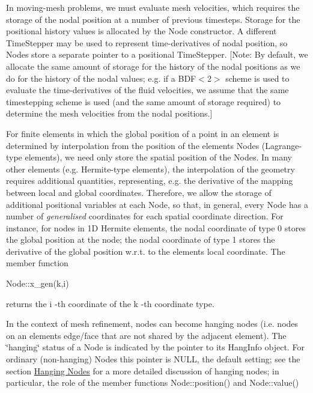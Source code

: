 \begin{DoxyItemize}
\item In moving-\/mesh problems, we must evaluate mesh velocities, which requires the storage of the nodal position at a number of previous timesteps. Storage for the positional history values is allocated by the {\ttfamily Node} constructor. A different {\ttfamily Time\+Stepper} may be used to represent time-\/derivatives of nodal position, so {\ttfamily Nodes} store a separate pointer to a positional {\ttfamily Time\+Stepper}. \mbox{[}Note\+: By default, we allocate the same amount of storage for the history of the nodal positions as we do for the history of the nodal values; e.\+g. if a {\ttfamily B\+D\+F$<$2$>$} scheme is used to evaluate the time-\/derivatives of the fluid velocities, we assume that the same timestepping scheme is used (and the same amount of storage required) to determine the mesh velocities from the nodal positions.\mbox{]}
\item For finite elements in which the global position of a point in an element is determined by interpolation from the position of the element\textquotesingle{}s {\ttfamily Nodes} (Lagrange-\/type elements), we need only store the spatial position of the {\ttfamily Nodes}. In many other elements (e.\+g. Hermite-\/type elements), the interpolation of the geometry requires additional quantities, representing, e.\+g. the derivative of the mapping between local and global coordinates. Therefore, we allow the storage of additional positional variables at each {\ttfamily Node}, so that, in general, every {\ttfamily Node} has a number of {\itshape generalised} coordinates for each spatial coordinate direction. For instance, for nodes in 1D Hermite elements, the nodal coordinate of type \textquotesingle{}0\textquotesingle{} stores the global position at the node; the nodal coordinate of type \textquotesingle{}1\textquotesingle{} stores the derivative of the global position w.\+r.\+t. to the element\textquotesingle{}s local coordinate. The member function
\begin{DoxyCode}
Node::x\_gen(k,i) 
\end{DoxyCode}
 returns the {\ttfamily i} -\/th coordinate of the {\ttfamily k} -\/th coordinate type.
\item In the context of mesh refinement, nodes can become hanging nodes (i.\+e. nodes on an element\textquotesingle{}s edge/face that are not shared by the adjacent element). The \char`\"{}hanging\char`\"{} status of a {\ttfamily Node} is indicated by the pointer to its {\ttfamily Hang\+Info} object. For ordinary (non-\/hanging) {\ttfamily Nodes} this pointer is N\+U\+LL, the default setting; see the section \hyperlink{index_Hanging_Nodes}{Hanging Nodes} for a more detailed discussion of hanging nodes; in particular, the role of the member functions {\ttfamily Node\+::position()} and {\ttfamily Node\+::value()} 

\end{DoxyItemize}
